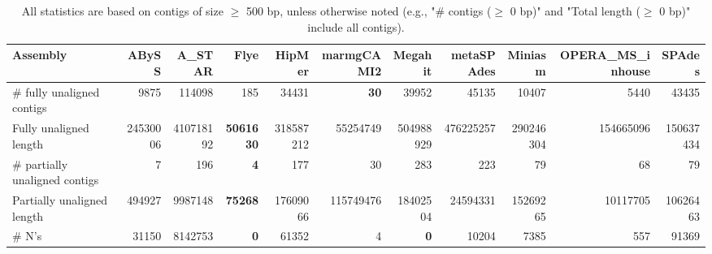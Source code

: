 \documentclass[12pt,a4paper]{article}
\begin{document}
\begin{table}[ht]
\begin{center}
\caption{All statistics are based on contigs of size $\geq$ 500 bp, unless otherwise noted (e.g., "\# contigs ($\geq$ 0 bp)" and "Total length ($\geq$ 0 bp)" include all contigs).}
\begin{tabular}{|l*{10}{|r}|}
\hline
Assembly & ABySS & A\_STAR & Flye & HipMer & marmgCAMI2 & Megahit & metaSPAdes & Miniasm & OPERA\_MS\_inhouse & SPAdes \\ \hline
\# fully unaligned contigs & 9875 & 114098 & 185 & 34431 & {\bf 30} & 39952 & 45135 & 10407 & 5440 & 43435 \\ \hline
Fully unaligned length & 24530006 & 410718192 & {\bf 5061630} & 318587212 & 55254749 & 504988929 & 476225257 & 290246304 & 154665096 & 150637434 \\ \hline
\# partially unaligned contigs & 7 & 196 & {\bf 4} & 177 & 30 & 283 & 223 & 79 & 68 & 79 \\ \hline
Partially unaligned length & 494927 & 9987148 & {\bf 75268} & 17609066 & 115749476 & 18402504 & 24594331 & 15269265 & 10117705 & 10626463 \\ \hline
\# N's & 31150 & 8142753 & {\bf 0} & 61352 & 4 & {\bf 0} & 10204 & 7385 & 557 & 91369 \\ \hline
\end{tabular}
\end{center}
\end{table}
\end{document}
